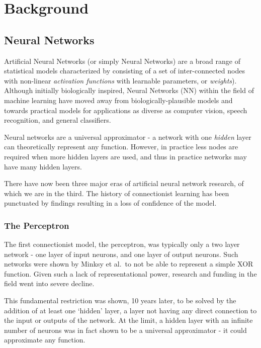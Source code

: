 \documentclass[thesis]{subfiles}
\begin{document}

\chapter{Background}
\label{background}
\ifpdf
    \graphicspath{{Figs/Raster/}{Figs/PDF/}{Figs/}}
\else
    \graphicspath{{Figs/Vector/}{Figs/}}
\fi

\section{Neural Networks}
Artificial Neural Networks (or simply Neural Networks) are a broad range of statistical models characterized by consisting of a set of inter-connected nodes with non-linear \emph{activation functions} with learnable parameters, or \emph{weights}). Although initially biologically inspired, Neural Networks (NN) within the field of machine learning have moved away from biologically-plausible models and towards practical models for applications as diverse as computer vision, speech recognition, and general classifiers.

Neural networks are a universal approximator - a network with one \emph{hidden} layer can theoretically represent any function. However, in practice less nodes are required when more hidden layers are used, and thus in practice networks may have many hidden layers.

There have now been three major eras of artificial neural network research, of which we are in the third. The history of connectionist learning has been punctuated by findings resulting in a loss of confidence of the model. 

\subsection{The Perceptron}
The first connectionist model, the perceptron, was typically only a two layer network - one layer of input neurons, and one layer of output neurons. Such networks were shown by Minksy et al.~to not be able to represent a simple XOR function. Given such a lack of representational power, research and funding in the field went into severe decline. 

This fundamental restriction was shown, 10 years later, to be solved by the addition of at least one `hidden' layer, \ie a layer not having any direct connection to the input or outputs of the network. At the limit, a hidden layer with an infinite number of neurons was in fact shown to be a universal approximator - it could approximate any function. 
\end{document}
